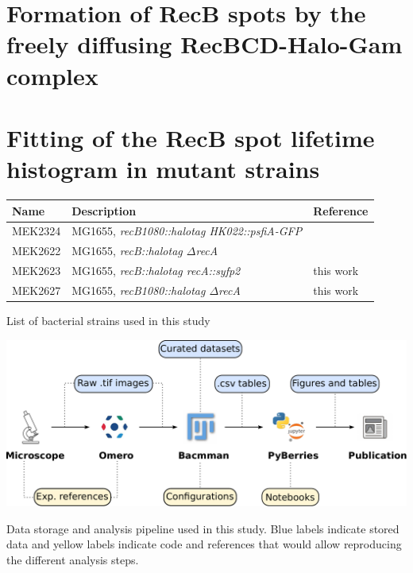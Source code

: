 \clearpage

\section{Formation of RecB spots by the freely diffusing RecBCD-Halo-Gam complex}
\label{note:spurious_spots}



\section{Fitting of the RecB spot lifetime histogram in mutant strains}  %
\label{note:mutants_fitting}


\clearpage

\setlength\intextsep{40pt}


\begin{supptable}[htbp]
    \centering
    \begin{tabular}{lll}
        \toprule
        Name & Description & Reference\\
        \midrule
        MEK2324 & MG1655, \textit{recB1080::halotag HK022::psfiA-GFP} & \\ %
        MEK2622 & MG1655, \textit{recB::halotag $\Delta$recA} & \\ %
        MEK2623 & MG1655, \textit{recB::halotag recA::syfp2} & this work\\
        MEK2627 & MG1655, \textit{recB1080::halotag $\Delta$recA} & this work \\
         \bottomrule
    \end{tabular}
    \caption{List of bacterial strains used in this study}
    \label{SItab:strains}
\end{supptable}

\begin{suppfigure*}[htbp]
\begin{center}
\includegraphics[width=\textwidth]{SI_Figures/Data_analysis_workflow.pdf}
\end{center}
\caption{Data storage and analysis pipeline used in this study. Blue labels indicate stored data and yellow labels indicate code and references that would allow reproducing the different analysis steps.}
\label{SIFig:analysis_workflow}
\end{suppfigure*}

